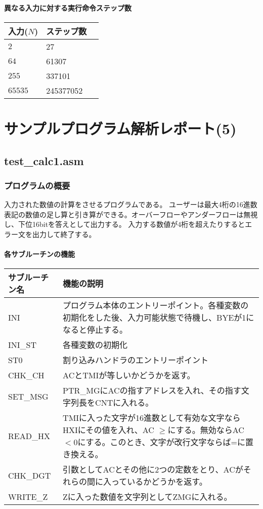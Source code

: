 \documentclass[dvipdfmx,12pt]{jreport}
\begin{document}
\subsubsection{異なる入力に対する実行命令ステップ数}
\begin{table}[h]
  \begin{tabular}{|l|l|l|} \hline
    入力($N$) & ステップ数 \\ \hline
    $2$ & 27 \\ \hline
    $64$ & 61307 \\ \hline
    $255$ & 337101 \\ \hline
    $65535$ & 245377052 \\ \hline
  \end{tabular}
\end{table}

\chapter*{サンプルプログラム解析レポート(5)}
\section{test\_calc1.asm}
\subsection{プログラムの概要}
入力された数値の計算をさせるプログラムである。
ユーザーは最大4桁の16進数表記の数値の足し算と引き算ができる。オーバーフローやアンダーフローは無視し、下位16bitを答えとして出力する。
入力する数値が4桁を超えたりするとエラー文を出力して終了する。

\subsubsection{各サブルーチンの機能}

\begin{table}[h]
  \begin{tabular}{|l|p{10cm}|} \hline
    サブルーチン名 & 機能の説明 \\ \hline
    INI & プログラム本体のエントリーポイント。各種変数の初期化をした後、入力可能状態で待機し、BYEが1になると停止する。 \\ \hline
    INI\_ST & 各種変数の初期化 \\ \hline
    ST0 & 割り込みハンドラのエントリーポイント \\ \hline
    CHK\_CH & ACとTMIが等しいかどうかを返す。 \\ \hline
    SET\_MSG & PTR\_MGにACの指すアドレスを入れ、その指す文字列長をCNTに入れる。 \\ \hline
    READ\_HX & TMIに入った文字が16進数として有効な文字ならHXIにその値を入れ、AC $\geq$にする。無効ならAC$<$0にする。このとき、文字が改行文字ならば=に置き換える。 \\ \hline
    CHK\_DGT & 引数としてACとその他に2つの定数をとり、ACがそれらの間に入っているかどうかを返す。 \\ \hline
    WRITE\_Z & Zに入った数値を文字列としてZMGに入れる。\\ \hline
  \end{tabular}
\end{table}
\end{document}

